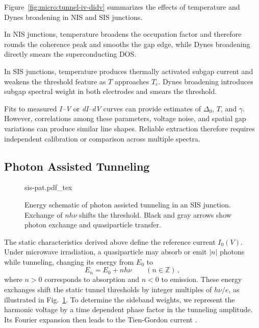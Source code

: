             Figure~\ref{fig:micro:tunnel-iv-didv} summarizes the effects of temperature and Dynes broadening in NIS and SIS junctions.

            In NIS junctions, temperature broadens the occupation factor and therefore rounds the coherence peak and smooths the gap edge, while Dynes broadening directly smears the superconducting DOS.

            In SIS junctions, temperature produces thermally activated subgap current and weakens the threshold feature as $T$ approaches $T_\mathrm{c}$. Dynes broadening introduces subgap spectral weight in both electrodes and smears the threshold.

        Fits to measured \textit{I--V} or \textit{dI--dV} curves can provide estimates of $\Delta_0$, $T$, and $\gamma$. However, correlations among these parameters, voltage noise, and spatial gap variations can produce similar line shapes. Reliable extraction therefore requires independent calibration or comparison across multiple spectra.

    \subsection{Photon Assisted Tunneling}
    \label{subsec:micro:pat}

        \begin{figure}
            \captionsetup{format=plain}%
            \centering
            \vspace{-1em}
            {sis-pat.pdf_tex}
            \caption{
                Energy schematic of photon assisted tunneling in an SIS junction. Exchange of $nh\nu$ shifts the threshold. Black and gray arrows show photon exchange and quasiparticle transfer.
                }
            \label{fig:micro:pat-schematic}
        \end{figure}
        The static characteristics derived above define the reference current $I_0(V)$. Under microwave irradiation, a quasiparticle may absorb or emit $|n|$ photons while tunneling, changing its energy from $E_0$ to
        \begin{equation}
            E_n = E_0 + n h\nu \qquad (n\in\mathbb{Z})\,,
        \end{equation}
        where $n>0$ corresponds to absorption and $n<0$ to emission. These energy exchanges shift the static tunnel thresholds by integer multiples of $h\nu/e$, as illustrated in Fig.~\ref{fig:micro:pat-schematic}. To determine the sideband weights, we represent the harmonic voltage by a time dependent phase factor in the tunneling amplitude. Its Fourier expansion then leads to the Tien-Gordon current \cite{tien_multiphoton_1963}.

